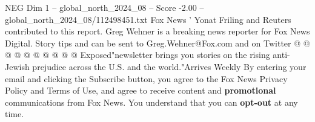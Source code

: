 \begin{textsample}{NEG Dim 1 – global\_north\_2024\_08 – Score -2.00 – global\_north\_2024\_08/112498451.txt}
Fox News ' Yonat Friling and Reuters contributed to this report.
Greg Wehner is a breaking news reporter for Fox News Digital.
Story tips and can be sent to Greg.Wehner@Fox.com and on Twitter @ @ @ @ @ @ @ @ @ @ Exposed"newsletter brings you stories on the rising anti-Jewish prejudice across the U.S. and the world."Arrives Weekly By entering your email and clicking the Subscribe button, you agree to the Fox News Privacy Policy and Terms of Use, and agree to receive content and \textbf{promotional} communications from Fox News.
You understand that you can \textbf{opt-out} at any time.

\end{textsample}
